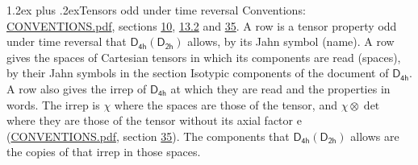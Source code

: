 \documentclass[10pt,a4paper]{article}
\makeatletter
\renewcommand\section{\@startsection{section}{1}{\z@}{-3ex plus -1ex minus -.2ex}%
  {1.2ex plus .2ex}{\normalfont\large\sffamily\bfseries\color{parttitle}}}
\numberwithin{equation}{section}
\newcommand{\grp}[1]{\mathsf{#1}}
\newcommand{\irrprod}{\otimes}
\makeatother
\begin{document}
\section{Tensors odd under time reversal}\label{s:time_odd}
Conventions: \href{../../CONVENTIONS.pdf}{CONVENTIONS.pdf}, sections \href{../../../rotation/CONVENTIONS.pdf\#conv.10}{10}, \href{../../../rotation/CONVENTIONS.pdf\#conv.13.2}{13.2} and \href{../../CONVENTIONS.pdf\#conv.35}{35}.
\leavevmode\label{n:head.name.property}A row is a tensor property odd under time reversal that $\grp{D_{4h}}(\grp{D_{2h}})$ allows, by its Jahn symbol (name). \label{n:head.spaces}A row gives the spaces of Cartesian tensors in which its components are read (spaces), by their Jahn symbols in the section Isotypic components of the document of \href{../../../rotation/data/pdf/D4h.pdf}{$\grp{D_{4h}}$}. \label{n:head.properties}A row also gives the irrep of $\grp{D_{4h}}$ at which they are read and the properties in words. The irrep is $\chi$ where the spaces are those of the tensor, and $\chi \irrprod \det$ where they are those of the tensor without its axial factor e (\href{../../CONVENTIONS.pdf}{CONVENTIONS.pdf}, section \href{../../CONVENTIONS.pdf\#conv.35}{35}). The components that $\grp{D_{4h}}(\grp{D_{2h}})$ allows are the copies of that irrep in those spaces.
\end{document}
